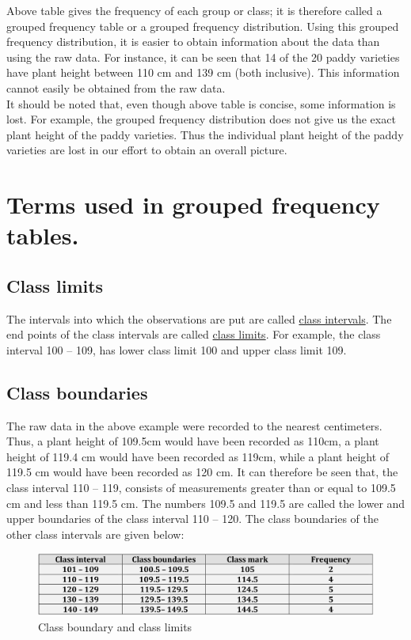 \documentclass[
]{book}
\begin{document}
Above table gives the frequency of each group or class; it is therefore
called a grouped frequency table or a grouped frequency distribution.
Using this grouped frequency distribution, it is easier to obtain
information about the data than using the raw data. For instance, it can
be seen that 14 of the 20 paddy varieties have plant height between 110
cm and 139 cm (both inclusive). This information cannot easily be
obtained from the raw data.\\
It should be noted that, even though above table is concise, some
information is lost. For example, the grouped frequency distribution
does not give us the exact plant height of the paddy varieties. Thus the
individual plant height of the paddy varieties are lost in our effort to
obtain an overall picture.

\section{Terms used in grouped frequency tables.}\label{terms-used-in-grouped-frequency-tables.}

\subsection{Class limits}\label{class-limits}

The intervals into which the observations are put are called \ul{class
intervals}. The end points of the class intervals are called
\ul{class limits}. For example, the class interval 100 -- 109,
has lower class limit 100 and upper class limit 109.

\subsection{Class boundaries}\label{class-boundaries}

The raw data in the above example were recorded to the nearest
centimeters. Thus, a plant height of 109.5cm would have been recorded as
110cm, a plant height of 119.4 cm would have been recorded as 119cm,
while a plant height of 119.5 cm would have been recorded as 120 cm. It
can therefore be seen that, the class interval 110 -- 119, consists of
measurements greater than or equal to 109.5 cm and less than 119.5 cm.
The numbers 109.5 and 119.5 are called the lower and upper boundaries of
the class interval 110 -- 120. The class boundaries of the other class
intervals are given below:

\begin{figure}

{\centering \includegraphics[width=1\linewidth]{images/fig1.7} 

}

\caption{Class boundary and class limits}\label{fig:figg}
\end{figure}
\end{document}
